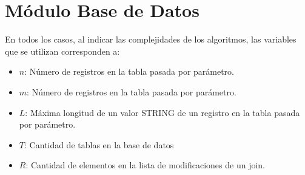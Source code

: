 \section{M\'odulo Base de Datos}

  En todos los casos, al indicar las complejidades de los algoritmos, las variables que se utilizan corresponden a:
  \vspace{-0.5em}\begin{itemize}
    \item $n$: N\'umero de registros en la tabla pasada por par\'ametro.
    \item $m$: N\'umero de registros en la tabla pasada por par\'ametro.
    \item $L$: M\'axima longitud de un valor STRING de un registro en la tabla pasada por par\'ametro.
    \item $T$: Cantidad de tablas en la base de datos
    \item $R$: Cantidad de elementos en la lista de modificaciones de un join.
  \end{itemize}


